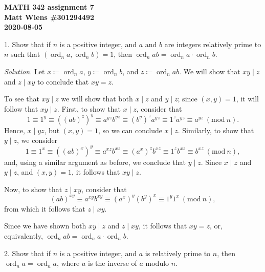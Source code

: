 \documentclass{article}
\newcommand{\Mod}[1]{\ (\mathrm{mod}\ #1)}
\DeclareMathOperator{\ord}{ord}
\begin{document}
\textbf{MATH 342 assignment 7} \\
\textbf{Matt Wiens \#301294492} \\
\textbf{2020-08-05}

1. Show that if $n$ is a positive integer, and $a$ and $b$ are integers
relatively prime to $n$ such that $(\ord_n a, \ord_n b) = 1$, then
$\ord_n ab = \ord_n a \cdot \ord_n b$.

\textit{Solution.}
Let $x \coloneqq \ord_n a$, $y \coloneqq \ord_n b$, and
$z \coloneqq \ord_n ab$. We will show that $x y \mid z$
and $z \mid x y$ to conclude that $x y = z$.

To see that $x y \mid z$ we will show that both $x \mid z$ and $y \mid
z$; since $(x, y) = 1$, it will follow that $x y \mid z$. First,
to show that $x \mid z$, consider that
%
\begin{equation*}
    1
    \equiv 1^y
    \equiv ((ab)^z)^y
    \equiv a^{y z} b^{y z}
    \equiv (b^y)^z a^{y z}
    \equiv 1^z a^{y z}
    \equiv a^{y z}
    \Mod{n}
    .
\end{equation*}
%
Hence, $x \mid yz$, but $(x, y) = 1$, so we can conclude $x \mid z$.
Similarly, to show that $y \mid z$, we consider
%
\begin{equation*}
    1
    \equiv 1^x
    \equiv ((ab)^x)^y
    \equiv a^{x z} b^{x z}
    \equiv (a^x)^z b^{x z}
    \equiv 1^z b^{x z}
    \equiv b^{x z}
    \Mod{n}
    ,
\end{equation*}
%
and, using a similar argument as before, we conclude that $y \mid z$.
Since $x \mid z$ and $y \mid z$, and $(x, y) = 1$, it follows that $x y \mid z$.

Now, to show that $z \mid xy$, consider that
%
\begin{equation*}
    (ab)^{xy}
    \equiv a^{xy} b^{xy}
    \equiv (a^x)^y (b^y)^x
    \equiv 1^y 1^x
    \Mod{n}
    ,
\end{equation*}
%
from which it follows that $z \mid xy$.

Since we have shown both $xy \mid z$ and $z \mid xy$, it follows that
$xy = z$, or, equivalently, $\ord_n ab = \ord_n a \cdot \ord_n b$.

\newpage

2. Show that if $n$ is a positive integer, and $a$ is relatively prime
to $n$, then $\ord_n \bar{a} = \ord_n a$, where $\bar{a}$ is the inverse
of $a$ modulo $n$.
\end{document}
